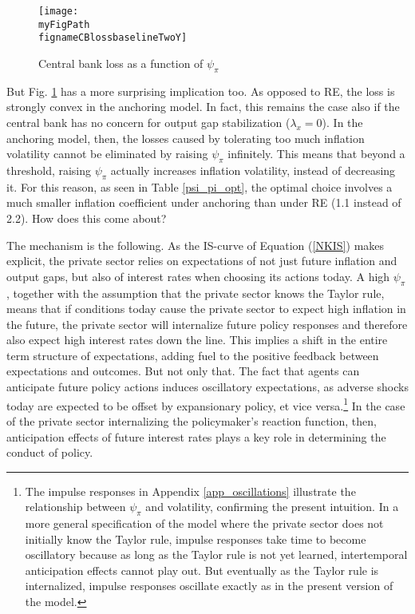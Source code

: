 \documentclass[11pt]{article}
\def \myFigPath {../../figures/}
\renewcommand{\[}{\begin{equation}}
\renewcommand{\]}{\end{equation}}
\def\fignameCBlossbaseline{plot_sim_loss_approx_pretty_losses_again_critsmooth_constant_only_pi_only_lamx0_05_lami0_2020_09_19}
\def\fignameCBlossbaselineTwoY{plot_sim_loss_approx_2y_losses_with_optimal_again_critsmooth_constant_only_pi_only_lamx0_05_lami0_2020_10_14}
\begin{document}
\begin{figure}[h!]
\texttt{[image: \\myFigPath \\fignameCBlossbaselineTwoY]}
\caption{Central bank loss as a function of $\psi_{\pi}$}
\label{fig_loss}
\end{figure}



But Fig. \ref{fig_loss} has a more surprising implication too. As opposed to RE, the loss is strongly convex in the anchoring model. In fact, this remains the case also if the central bank has no concern for output gap stabilization ($\lambda_x = 0$). In the anchoring model, then, the losses caused by tolerating too much inflation volatility cannot be eliminated by raising $\psi_{\pi}$ infinitely. This means that beyond a threshold, raising $\psi_{\pi}$ actually increases inflation volatility, instead of decreasing it. For this reason, as seen in Table \ref{psi_pi_opt}, the optimal choice involves a much smaller inflation coefficient under anchoring than under RE (1.1 instead of 2.2). How does this come about?

The mechanism is the following. As the IS-curve of Equation (\ref{NKIS}) makes explicit, the private sector relies on expectations of not just future inflation and output gaps, but also of interest rates when choosing its actions today. A high $\psi_{\pi}$, together with the assumption that the private sector knows the Taylor rule, means that if conditions today cause the private sector to expect high inflation in the future, the private sector will internalize future policy responses and therefore also expect high interest rates down the line. This implies a shift in the entire term structure of expectations, adding fuel to the positive feedback between expectations and outcomes. But not only that. The fact that agents can anticipate future policy actions induces oscillatory expectations, as adverse shocks today are expected to be offset by expansionary policy, et vice versa.\footnote{The impulse responses in Appendix \ref{app_oscillations} illustrate the relationship between $\psi_{\pi}$ and volatility, confirming the present intuition. In a more general specification of the model where the private sector does not initially know the Taylor rule, impulse responses take time to become oscillatory because as long as the Taylor rule is not yet learned, intertemporal anticipation effects cannot play out. But eventually as the Taylor rule is internalized, impulse responses oscillate exactly as in the present version of the model.} In the case of the private sector internalizing the policymaker's reaction function, then, anticipation effects of future interest rates plays a key role in determining the conduct of policy.
\end{document}
